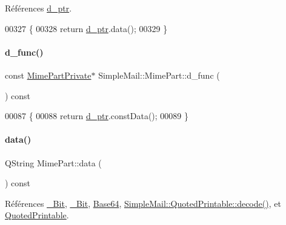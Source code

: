 Références \hyperlink{class_simple_mail_1_1_mime_part_a6adc00256ce96a9282f2ec0224625b0b}{d\+\_\+ptr}.


\begin{DoxyCode}
00327 \{
00328     \textcolor{keywordflow}{return} \hyperlink{class_simple_mail_1_1_mime_part_a6adc00256ce96a9282f2ec0224625b0b}{d\_ptr}.data();
00329 \}
\end{DoxyCode}
\mbox{\label{class_simple_mail_1_1_mime_part_a5ae5c144f7a80afd6b5ef36512baf67a}} 
\paragraph{\texorpdfstring{d\+\_\+func()}{d\_func()}\hspace{0.1cm}{\footnotesize\ttfamily [2/2]}}
{\footnotesize\ttfamily const \hyperlink{class_simple_mail_1_1_mime_part_private}{Mime\+Part\+Private}$\ast$ Simple\+Mail\+::\+Mime\+Part\+::d\+\_\+func (\begin{DoxyParamCaption}{ }\end{DoxyParamCaption}) const\hspace{0.3cm}{\ttfamily [protected]}}


\begin{DoxyCode}
00087     \{
00088         \textcolor{keywordflow}{return} \hyperlink{class_simple_mail_1_1_mime_part_a6adc00256ce96a9282f2ec0224625b0b}{d\_ptr}.constData();
00089     \}
\end{DoxyCode}
\mbox{\label{class_simple_mail_1_1_mime_part_ab6260fc481df5162673f1ac93ec92dac}} 
\paragraph{\texorpdfstring{data()}{data()}}
{\footnotesize\ttfamily Q\+String Mime\+Part\+::data (\begin{DoxyParamCaption}{ }\end{DoxyParamCaption}) const}



Références \hyperlink{class_simple_mail_1_1_mime_part_ae67a2f5406958b95b18bf31a7bbeb5c9a93d518d86036ce6f149ffa646b52235a}{\+\_\+Bit}, \hyperlink{class_simple_mail_1_1_mime_part_ae67a2f5406958b95b18bf31a7bbeb5c9a27c1574a6fe2fa936ae6cfe9654bb37f}{\+\_\+Bit}, \hyperlink{class_simple_mail_1_1_mime_part_ae67a2f5406958b95b18bf31a7bbeb5c9ae644dc14ba856889814d2da9c995b91a}{Base64}, \hyperlink{class_simple_mail_1_1_quoted_printable_a0d2348902e414c30afbcd970e9270eea}{Simple\+Mail\+::\+Quoted\+Printable\+::decode()}, et \hyperlink{class_simple_mail_1_1_mime_part_ae67a2f5406958b95b18bf31a7bbeb5c9a29b5533d69a04cfef2c3ff6538c44db0}{Quoted\+Printable}.



